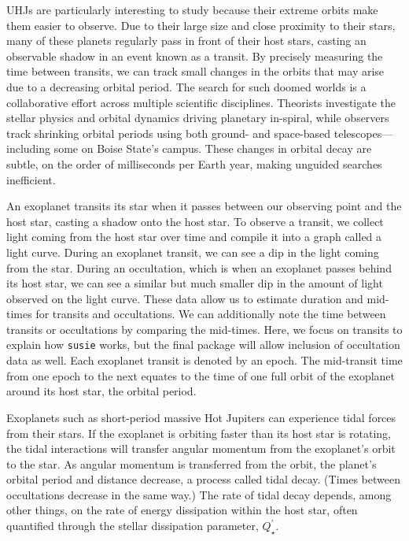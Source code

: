 \documentclass[oneside,12pt]{amsart}
\numberwithin{page}{section}
\begin{document}
UHJs are particularly interesting to study because their extreme orbits make them easier to observe. Due to their large size and close proximity to their stars, many of these planets regularly pass in front of their host stars, casting an observable shadow in an event known as a transit. By precisely measuring the time between transits, we can track small changes in the orbits that may arise due to a decreasing orbital period.
The search for such doomed worlds is a collaborative effort across multiple scientific disciplines. Theorists investigate the stellar physics and orbital dynamics driving planetary in-spiral, while observers track shrinking orbital periods using both ground- and space-based telescopes—including some on Boise State’s campus. These changes in orbital decay are subtle, on the order of milliseconds per Earth year, making unguided searches inefficient.

An exoplanet transits its star when it passes between our observing point and the host star, casting a shadow onto the host star. To observe a transit, we collect light coming from the host star over time and compile it into a graph called a light curve. During an exoplanet transit, we can see a dip in the light coming from the star. During an occultation, which is when an exoplanet passes behind its host star, we can see a similar but much smaller dip in the amount of light observed on the light curve. These data allow us to estimate duration and mid-times for transits and occultations. We can additionally note the time between transits or occultations by comparing the mid-times. Here, we focus on transits to explain how \texttt{susie} works, but the final package will allow inclusion of occultation data as well. Each exoplanet transit is denoted by an epoch. The mid-transit time from one epoch to the next equates to the time of one full orbit of the exoplanet around its host star, the orbital period.

Exoplanets such as short-period massive Hot Jupiters can experience tidal forces from their stars. If the exoplanet is orbiting faster than its host star is rotating, the tidal interactions will transfer angular momentum from the exoplanet's orbit to the star. As angular momentum is transferred from the orbit, the planet's orbital period and distance decrease, a process called tidal decay. (Times between occultations decrease in the same way.) The rate of tidal decay depends, among other things, on the rate of energy dissipation within the host star, often quantified through the stellar dissipation parameter, $Q_\star^\prime$.
\end{document}
